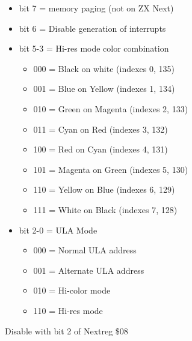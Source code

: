\begin{itemize}
\item[] bit 7 = memory paging (not on ZX Next)
\item[] bit 6 = Disable generation of interrupts
\item[] bit 5-3 = Hi-res mode color combination
  \begin{itemize}
  \item[] 000 = Black on white (indexes 0, 135)
  \item[] 001 = Blue on Yellow (indexes 1, 134)
  \item[] 010 = Green on Magenta (indexes 2, 133)
  \item[] 011 = Cyan on Red (indexes 3, 132)
  \item[] 100 = Red on Cyan (indexes 4, 131)
  \item[] 101 = Magenta on Green (indexes 5, 130)
  \item[] 110 = Yellow on Blue (indexes 6, 129)
  \item[] 111 = White on Black (indexes 7, 128)
  \end{itemize}
\item[] bit 2-0 = ULA Mode
  \begin{itemize}
  \item[] 000 = Normal ULA address
  \item[] 001 = Alternate ULA address
  \item[] 010 = Hi-color mode 
  \item[] 110 = Hi-res mode
  \end{itemize}
\end{itemize}
Disable with bit 2 of Nextreg \$08

